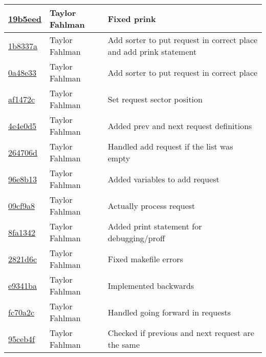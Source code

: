 \begin{tabular}{l l l}
\href{https://github.com/fahlmant/cs444/commit/19b5eed5fce8f0988d6de8e32433e71ec722f401}{19b5eed} & Taylor Fahlman & Fixed prink\\\hline
\href{https://github.com/fahlmant/cs444/commit/1b8337adbfd556c19331c13e47fdf30f6be4aa2c}{1b8337a} & Taylor Fahlman & Add sorter to put request in correct place and add prink statement\\\hline
\href{https://github.com/fahlmant/cs444/commit/0a48e33e7e336bcfa08225cb01f3df0fcaaed1f8}{0a48e33} & Taylor Fahlman & Add sorter to put request in correct place\\\hline
\href{https://github.com/fahlmant/cs444/commit/af1472c36acd59ba67588633806bf0893cfe8b8b}{af1472c} & Taylor Fahlman & Set request sector position\\\hline
\href{https://github.com/fahlmant/cs444/commit/4e4e0d50bb79cb0287dd9e15bf858950aca4e52c}{4e4e0d5} & Taylor Fahlman & Added prev and next request definitions\\\hline
\href{https://github.com/fahlmant/cs444/commit/264706d970dd72869b019450b1f75bc089303f51}{264706d} & Taylor Fahlman & Handled add request if the list was empty\\\hline
\href{https://github.com/fahlmant/cs444/commit/96e8b1364367fb70321afbf63863220dec0966bb}{96e8b13} & Taylor Fahlman & Added variables to add request\\\hline
\href{https://github.com/fahlmant/cs444/commit/09cf9a81142f457cc824439568eb4f7d0202b485}{09cf9a8} & Taylor Fahlman & Actually process request\\\hline
\href{https://github.com/fahlmant/cs444/commit/8fa13421d3f213f3e1698235bd37426b314838d6}{8fa1342} & Taylor Fahlman & Added print statement for debugging/proff\\\hline
\href{https://github.com/fahlmant/cs444/commit/2821d6ce67d5d1a5051838079defe48c4f14ee9f}{2821d6c} & Taylor Fahlman & Fixed makefile errors\\\hline
\href{https://github.com/fahlmant/cs444/commit/e9341bad2ae0d815c1eddedcb0070bb99c3ae231}{e9341ba} & Taylor Fahlman & Implemented backwards\\\hline
\href{https://github.com/fahlmant/cs444/commit/fc70a2c72e4933dbf271bf6f5b4adc250cd93f0b}{fc70a2c} & Taylor Fahlman & Handled going forward in requests\\\hline
\href{https://github.com/fahlmant/cs444/commit/95ceb4f9438107951331d241099b020416a2e580}{95ceb4f} & Taylor Fahlman & Checked if previous and next request are the same\\\hline

\end{tabular}
